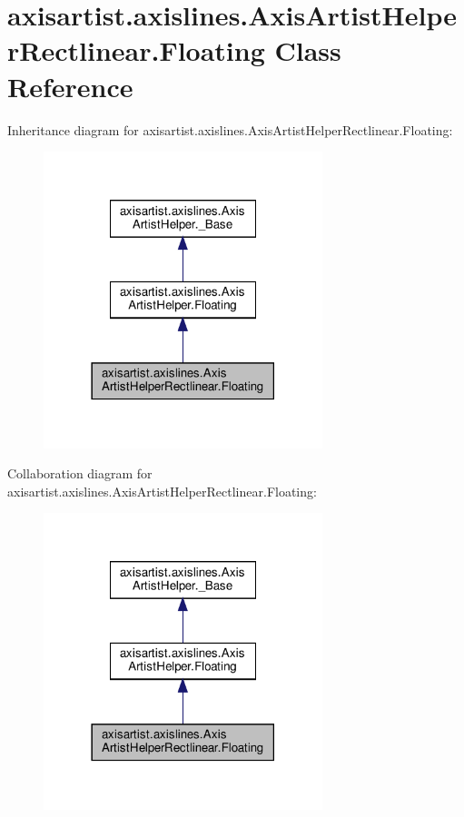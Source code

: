 \hypertarget{classaxisartist_1_1axislines_1_1AxisArtistHelperRectlinear_1_1Floating}{}\section{axisartist.\+axislines.\+Axis\+Artist\+Helper\+Rectlinear.\+Floating Class Reference}
\label{classaxisartist_1_1axislines_1_1AxisArtistHelperRectlinear_1_1Floating}


Inheritance diagram for axisartist.\+axislines.\+Axis\+Artist\+Helper\+Rectlinear.\+Floating\+:
\nopagebreak
\begin{figure}[H]
\begin{center}
\leavevmode
\includegraphics[width=230pt]{classaxisartist_1_1axislines_1_1AxisArtistHelperRectlinear_1_1Floating__inherit__graph}
\end{center}
\end{figure}


Collaboration diagram for axisartist.\+axislines.\+Axis\+Artist\+Helper\+Rectlinear.\+Floating\+:
\nopagebreak
\begin{figure}[H]
\begin{center}
\leavevmode
\includegraphics[width=230pt]{classaxisartist_1_1axislines_1_1AxisArtistHelperRectlinear_1_1Floating__coll__graph}
\end{center}
\end{figure}
